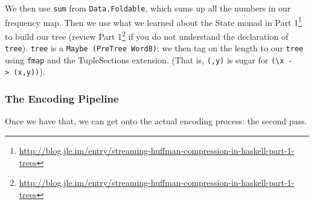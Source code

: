 \documentclass[]{article}
\newenvironment{Shaded}{}{}
\newcommand{\CommentTok}[1]{\textcolor[rgb]{0.38,0.63,0.69}{\textit{#1}}}
\newcommand{\DataTypeTok}[1]{\textcolor[rgb]{0.56,0.13,0.00}{#1}}
\newcommand{\KeywordTok}[1]{\textcolor[rgb]{0.00,0.44,0.13}{\textbf{#1}}}
\newcommand{\NormalTok}[1]{#1}
\newcommand{\OperatorTok}[1]{\textcolor[rgb]{0.40,0.40,0.40}{#1}}
\newcommand{\OtherTok}[1]{\textcolor[rgb]{0.00,0.44,0.13}{#1}}
\renewcommand{\href}[2]{#2\footnote{\url{#1}}}
\begin{document}
We then use \texttt{sum} from \texttt{Data.Foldable}, which sums up all the
numbers in our frequency map. Then we use what we learned about the State monad
in
\href{http://blog.jle.im/entry/streaming-huffman-compression-in-haskell-part-1-trees}{Part
1} to build our tree (review
\href{http://blog.jle.im/entry/streaming-huffman-compression-in-haskell-part-1-trees}{Part
1} if you do not understand the declaration of \texttt{tree}). \texttt{tree} is
a \texttt{Maybe\ (PreTree\ Word8)}; we then tag on the length to our
\texttt{tree} using \texttt{fmap} and the TupleSections extension. (That is,
\texttt{(,y)} is sugar for
\texttt{(\textbackslash{}x\ -\textgreater{}\ (x,y))}).

\subsubsection{The Encoding Pipeline}\label{the-encoding-pipeline}

Once we have that, we can get onto the actual encoding process: the second pass.

\begin{Shaded}
\end{Shaded}
\end{document}
